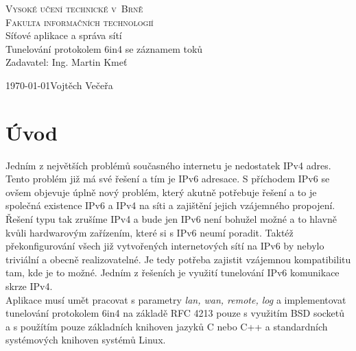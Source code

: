 \documentclass[12pt,a4paper,onecolumn]{article}
\begin{document}
\begin{titlepage}
    \begin{center}
        \textsc{\Huge Vysoké učení technické v~Brně\\\huge Fakulta informačních technologií}\\
        \LARGE Síťové aplikace a správa sítí\\
        \Huge Tunelování protokolem 6in4 se záznamem toků\\
        \large Zadavatel: Ing. Martin Kmeť\\
    \end{center}
    {\Large\today\hfill Vojtěch Večeřa }
\end{titlepage}
\tableofcontents
\newpage
\section{Úvod}
Jedním z největších problémů současného internetu je nedostatek IPv4 adres. Tento problém již má
své řešení a tím je IPv6 adresace. S příchodem IPv6 se ovšem objevuje úplně nový problém, který
akutně potřebuje řešení a to je společná existence IPv6 a IPv4 na síti a zajištění jejich
vzájemného propojení. Řešení typu tak zrušíme IPv4 a bude jen IPv6 není bohužel možné a to hlavně
kvůli hardwarovým zařízením, které si s IPv6 neumí poradit. Taktéž překonfigurování všech
již vytvořených internetových sítí na IPv6 by nebylo triviální a obecně realizovatelné. Je tedy
potřeba zajistit vzájemnou kompatibilitu tam, kde je to možné. Jedním z řešeních je využití
tunelování IPv6 komunikace skrze IPv4.\\
\indent Aplikace musí umět pracovat s parametry {\it lan, wan, remote, log} a implementovat
tunelování protokolem 6in4 na základě RFC 4213 pouze s využitím BSD socketů a s použítím pouze
základních knihoven jazyků C nebo C++ a standardních systémových knihoven systémů Linux. 
\end{document}
